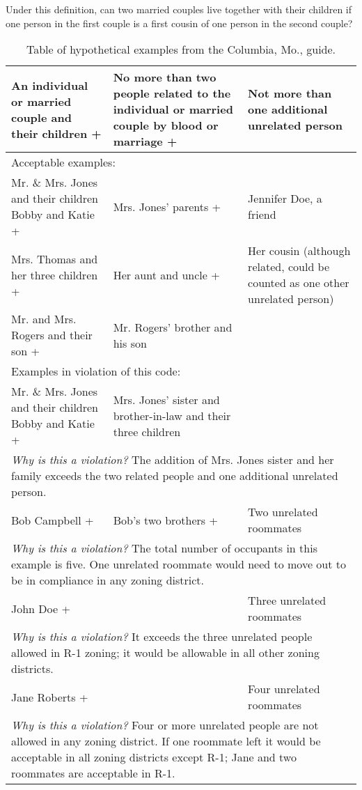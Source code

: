 Under this definition, can two married couples live together with their children
if one person in the first couple is a first cousin of one person in the second
couple?

\begin{table}
\begin{center}
\readingfont
\footnotesize
\begin{tabular}{p{}p{}p{}}
\textbf{An individual or married couple and their children +} &
\textbf{No more than two people related to the individual or married couple by
blood or marriage +} &
\textbf{Not more than one additional unrelated person} \\
\hline
\multicolumn{3}{l}{Acceptable examples:} \\
\hline
Mr. \& Mrs. Jones and their children Bobby and Katie + & Mrs. Jones' parents
+ & Jennifer Doe, a friend \\
Mrs. Thomas and her three children + & Her aunt and uncle + & Her cousin
(although related, could be counted as one other unrelated person) \\
Mr. and Mrs. Rogers and their son + & Mr. Rogers' brother and his son & \\
\hline
\multicolumn{3}{l}{Examples in violation of this code:} \\
\hline
Mr. \& Mrs. Jones and their children Bobby and Katie + & Mrs. Jones'
sister and brother-in-law and their three children & \\
\multicolumn{3}{p{0.9\textwidth}}{\emph{Why is this a violation?}
The addition of Mrs. Jones sister and her family exceeds the two related people
and one additional unrelated person.} \\
\hline
Bob Campbell + & Bob's two brothers + & Two unrelated roommates \\
\multicolumn{3}{p{0.9\textwidth}}{\emph{Why is this a violation?}
The total number of occupants in this example is five. One unrelated roommate
would need to move out to be in compliance in any zoning district.} \\
\hline
John Doe + & & Three unrelated roommates \\
\multicolumn{3}{p{0.9\textwidth}}{\emph{Why is this a violation?}
It exceeds the three unrelated people allowed in R-1 zoning; it would be
allowable in all other zoning districts.} \\
\hline
Jane Roberts + & & Four unrelated roommates \\
\multicolumn{3}{p{0.9\textwidth}}{\emph{Why is this a violation?}
Four or more unrelated people are not allowed in any zoning district. If one
roommate left it would be acceptable in all zoning districts except R-1; Jane
and two roommates are acceptable in R-1.} \\
\end{tabular}
\end{center}
\caption{Table of hypothetical examples from the Columbia, Mo., guide.}
\label{t:family-def}
\end{table}

